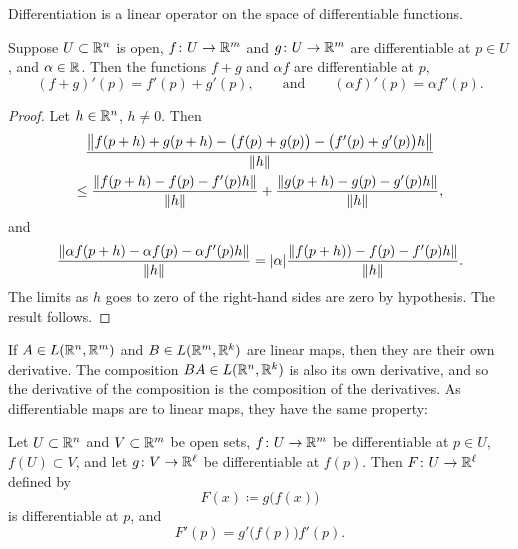 Differentiation is a linear operator on the space of differentiable
functions.

\begin{prop}
Suppose $U \subset {\mathbb{R}}^n$ is open,
$f \colon U \to {\mathbb{R}}^m$ and
$g \colon U \to {\mathbb{R}}^m$ are differentiable at $p \in U$,
and $\alpha \in {\mathbb{R}}$.  Then the functions $f+g$ and $\alpha f$
are differentiable at $p$,
\begin{equation*}
(f+g)'(p) = f'(p) + g'(p) , \qquad \text{and} \qquad (\alpha f)'(p) = \alpha
f'(p) .
\end{equation*}
\end{prop}

\begin{proof}
Let $h \in {\mathbb{R}}^n$, $h \not= 0$.  Then
\begin{multline*}
\frac{\left\lVert {f(p+h)+g(p+h)-\bigl(f(p)+g(p)\bigr) - \bigl(f'(p) + g'(p)\bigr)h} \right\rVert}{\lVert {h} \rVert}
\\
\leq
\frac{\left\lVert {f(p+h)-f(p) - f'(p)h} \right\rVert}{\lVert {h} \rVert}
+
\frac{\left\lVert {g(p+h)-g(p) - g'(p)h} \right\rVert}{\lVert {h} \rVert} ,
\end{multline*}
and
\begin{equation*}
\frac{\left\lVert {\alpha f(p+h) - \alpha f(p) - \alpha f'(p)h} \right\rVert}{\lVert {h} \rVert}
=
\lvert {\alpha} \rvert \frac{\left\lVert {f(p+h))-f(p) - f'(p)h} \right\rVert}{\lVert {h} \rVert} .
\end{equation*}
The limits as $h$ goes to zero of the right-hand sides are zero by
hypothesis.  The result follows.
\end{proof}

If $A \in L({\mathbb{R}}^n,{\mathbb{R}}^m)$ and $B \in L({\mathbb{R}}^m,{\mathbb{R}}^k)$ are linear maps, then 
they are their own derivative.  The composition
$BA \in L({\mathbb{R}}^n,{\mathbb{R}}^k)$ is also its own derivative, and
so the derivative of the composition is the composition
of the derivatives.  As differentiable maps are
to linear maps, they have the same property:

\begin{thm} 
Let $U \subset {\mathbb{R}}^n$ and $V \subset {\mathbb{R}}^m$ be open sets, $f \colon U \to
{\mathbb{R}}^m$ be differentiable at $p \in U$, $f(U) \subset V$,
and let $g \colon V \to {\mathbb{R}}^\ell$ be differentiable
at $f(p)$.  Then $F \colon U \to {\mathbb{R}}^{\ell}$ defined by
\begin{equation*}
F(x) \coloneqq g\bigl(f(x)\bigr)
\end{equation*}
is differentiable at $p$, and
\begin{equation*}
F'(p) = g'\bigl(f(p)\bigr) f'(p) .
\end{equation*}
\end{thm}


